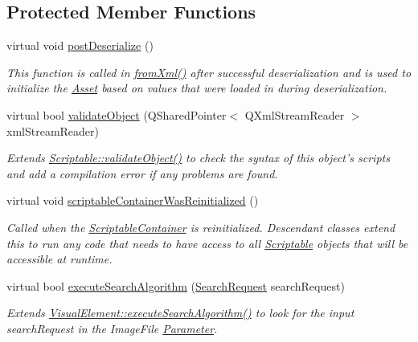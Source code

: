 \subsection*{Protected Member Functions}
\begin{DoxyCompactItemize}
\item 
virtual void \hyperlink{class_picto_1_1_image_graphic_a466cb8ab04110a29cf38135b13f94d3f}{post\-Deserialize} ()
\begin{DoxyCompactList}\small\item\em This function is called in \hyperlink{class_picto_1_1_asset_a8bed4da09ecb1c07ce0dab313a9aba67}{from\-Xml()} after successful deserialization and is used to initialize the \hyperlink{class_picto_1_1_asset}{Asset} based on values that were loaded in during deserialization. \end{DoxyCompactList}\item 
\hypertarget{class_picto_1_1_image_graphic_a65a45164a3be65e08b97a747bb542c3f}{virtual bool \hyperlink{class_picto_1_1_image_graphic_a65a45164a3be65e08b97a747bb542c3f}{validate\-Object} (Q\-Shared\-Pointer$<$ Q\-Xml\-Stream\-Reader $>$ xml\-Stream\-Reader)}\label{class_picto_1_1_image_graphic_a65a45164a3be65e08b97a747bb542c3f}

\begin{DoxyCompactList}\small\item\em Extends \hyperlink{class_picto_1_1_scriptable_ab6e2944c43a3b5d418bf7b251594386d}{Scriptable\-::validate\-Object()} to check the syntax of this object's scripts and add a compilation error if any problems are found. \end{DoxyCompactList}\item 
virtual void \hyperlink{class_picto_1_1_image_graphic_a8478af61f62ef10321ce149f1fc3dee6}{scriptable\-Container\-Was\-Reinitialized} ()
\begin{DoxyCompactList}\small\item\em Called when the \hyperlink{class_picto_1_1_scriptable_container}{Scriptable\-Container} is reinitialized. Descendant classes extend this to run any code that needs to have access to all \hyperlink{class_picto_1_1_scriptable}{Scriptable} objects that will be accessible at runtime. \end{DoxyCompactList}\item 
\hypertarget{class_picto_1_1_image_graphic_a90efb1410f9d231bb7418b2eeb6e03da}{virtual bool \hyperlink{class_picto_1_1_image_graphic_a90efb1410f9d231bb7418b2eeb6e03da}{execute\-Search\-Algorithm} (\hyperlink{struct_search_request}{Search\-Request} search\-Request)}\label{class_picto_1_1_image_graphic_a90efb1410f9d231bb7418b2eeb6e03da}

\begin{DoxyCompactList}\small\item\em Extends \hyperlink{class_picto_1_1_scriptable_container_aae46c50e128e021f5ad66cb8b419c65a}{Visual\-Element\-::execute\-Search\-Algorithm()} to look for the input search\-Request in the Image\-File \hyperlink{class_picto_1_1_parameter}{Parameter}. \end{DoxyCompactList}\end{DoxyCompactItemize}
